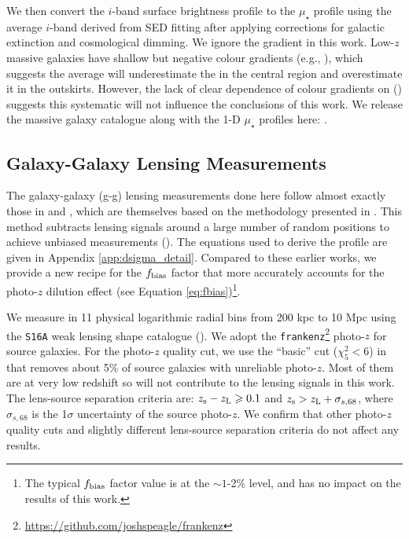 \documentclass[fleqn,usenatbib,useAMS]{mnras}
\begin{document}
    We then convert the $i$-band surface brightness profile to the $\mu_{\star}$ profile using the
    average $i$-band \mlratio{} derived from SED fitting after applying corrections for
    galactic extinction and cosmological dimming.
    We ignore the \mlratio{} gradient in this work.
    Low-$z$ massive galaxies have shallow but negative colour gradients (e.g., \citealt{Huang2018b,
    Wang2019, Montes2021}), which suggests the average \mlratio{} will underestimate the \mstar{} in
    the central region and overestimate it in the outskirts.
    However, the lack of clear dependence of colour gradients on \mstar{} (\citealt{Huang2018b})
    suggests this systematic will not influence the conclusions of this work.
    We release the massive galaxy catalogue along with the 1-D $\mu_{\star}$ profiles here: 
    \href{https://zenodo.org/record/5259075}{\faDatabase}.

\subsection{Galaxy-Galaxy Lensing Measurements}
    \label{sec:dsigma}

    The galaxy-galaxy (g-g) lensing measurements done here follow almost exactly those in 
    \citet{Speagle2019} and \citet{Huang2020}, which are themselves based on the methodology 
    presented in \citet{Leauthaud2017}.
    This method subtracts lensing signals around a large number of random positions to achieve
    unbiased measurements (\citealt{Singh2017}). 
    The equations used to derive the \dsigma{} profile are given in Appendix
    \ref{app:dsigma_detail}.
    Compared to these earlier works, we provide a new recipe for the $f_{\rm bias}$ factor that more
    accurately accounts for the photo-$z$ dilution effect (see Equation \ref{eq:fbias})\footnote{The
    typical $f_{\rm bias}$ factor value is at the $\sim 1$-2\% level, and has no impact on the
    results of this work.}.

    We measure \dsigma{} in 11 physical logarithmic radial bins from 200 kpc to 10 Mpc using 
    the \texttt{S16A} weak lensing shape catalogue (\citealt{HSC-WLCAT, HSC-WLCALIB}). 
    We adopt the \texttt{frankenz}\footnote{\url{https://github.com/joshspeagle/frankenz}} photo-$z$
    for source galaxies. 
    For the photo-$z$ quality cut, we use the ``basic'' cut ($\chi^{2}_{5} < 6$) in 
    \citet{Speagle2019} that removes about 5\% of source galaxies with unreliable photo-$z$.
    Most of them are at very low redshift so will not contribute to the lensing signals in this work.
    The lens-source separation criteria are: $z_{\rm s} - z_{\rm L} \ge 0.1$ and
    $z_{\rm s} > z_{\rm L} + \sigma_{s,68}$, where $\sigma_{s,68}$ is the 1$\sigma$ uncertainty
    of the source photo-$z$.
    We confirm that other photo-$z$ quality cuts and slightly different lens-source separation
    criteria do not affect any results.
\end{document}
